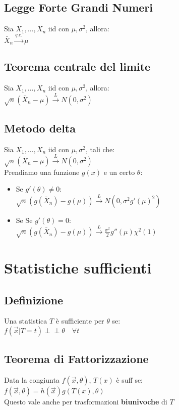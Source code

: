 \documentclass[a4paper,notitlepage]{report}%
\newcommand{\indep}{\perp \!\!\! \perp} %
\begin{document}
\begin{multicols*}{2}
    \subsection*{Legge Forte Grandi Numeri}
    Sia $X_1, \dots, X_n$ iid con $\mu, \sigma^2$, allora:\\
    $\bar{X}_n \overset{q.c.}{\to} \mu$


    \subsection*{Teorema centrale del limite}
    Sia $X_1, \dots, X_n$ iid con $\mu, \sigma^2$, allora:\\
    $\sqrt{n}(\bar{X}_n - \mu) \overset{L}{\to} N(0,\sigma^2)$


    \subsection*{Metodo delta}
    Sia $X_1, \dots, X_n$ iid con $\mu, \sigma^2$, tali che:\\
    $\sqrt{n}(\bar{X}_n - \mu) \overset{L}{\to} N(0,\sigma^2)$ \\
    Prendiamo una funzione $g(x)$ e un certo $\theta$:
    \begin{itemize}
        \item Se $g'(\theta)\neq0$: \\
            $\sqrt{n}(g(\bar{X}_n) - g(\mu)) \overset{L}{\to} N(0,\sigma^2g'(\mu)^2)$
        \item Se Se $g'(\theta)=0$: \\
        $\sqrt{n}(g(\bar{X}_n) - g(\mu)) \overset{L}{\to} \frac{\sigma^2}{2} g''(\mu)\chi^2(1)$
    \end{itemize}


\section*{Statistiche sufficienti}


    \subsection*{Definizione}
    Una statistica $T$ è sufficiente per $\theta$ se:\\
    $f(\vec{x}|T=t) \indep \theta \quad \forall t$


    \subsection*{Teorema di Fattorizzazione}
    Data la congiunta $f(\vec{x},\theta)$, $T(x)$ è suff se:\\
    $f(\vec{x},\theta) = h(\vec{x}) g(T(x),\theta)$\\
    Questo vale anche per trasformazioni \textbf{biunivoche} di $T$



\end{multicols*}
\end{document}
